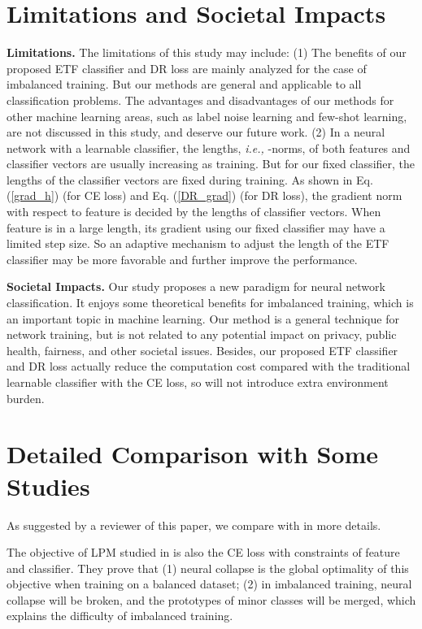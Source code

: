 \documentclass{article}
\newcommand{\<}{\left\langle}
\renewcommand{\>}{\right\rangle}
\begin{document}
\begin{center}
{\section{Limitations and Societal Impacts}
\label{limit}

\textbf{Limitations.} The limitations of this study may include: (1) The benefits of our proposed ETF classifier and DR loss are mainly analyzed for the case of imbalanced training. But our methods are general and applicable to all classification problems. The advantages and disadvantages of our methods for other machine learning areas, such as label noise learning and few-shot learning, are not discussed in this study, and deserve our future work. (2) In a neural network with a learnable classifier, the lengths, \emph{i.e.,} -norms, of both features and classifier vectors are usually increasing as training. But for our fixed classifier, the lengths of the classifier vectors are fixed during training. As shown in Eq. (\ref{grad_h}) (for CE loss) and Eq. (\ref{DR_grad}) (for DR loss), the gradient norm with respect to feature is decided by the lengths of classifier vectors. When feature is in a large length, its gradient using our fixed classifier may have a  limited step size. So an adaptive mechanism to adjust the length of the ETF classifier may be more favorable and further improve the performance.



\textbf{Societal Impacts.} Our study proposes a new paradigm for neural network classification. It enjoys some theoretical benefits for imbalanced training, which is an important topic in machine learning. Our method is a general technique for network training, but is not related to any potential impact on privacy, public health, fairness, and other societal issues. Besides, our proposed ETF classifier and DR loss actually reduce the computation cost compared with the traditional learnable classifier with the CE loss, so will not introduce extra environment burden. 

\section{Detailed Comparison with Some Studies}
\label{detailed compare}

As suggested by a reviewer of this paper, we compare with \cite{fang2021exploring,pernici2021regular,zhu2021geometric} in more details. 

The objective of LPM studied in \cite{fang2021exploring} is also the CE loss with constraints of feature and classifier. They prove that (1) neural collapse is the global optimality of this objective when training on a balanced dataset; (2) in imbalanced training, neural collapse will be broken, and the prototypes of minor classes will be merged, which explains the difficulty of imbalanced training.

}
\end{center}
\end{document}
